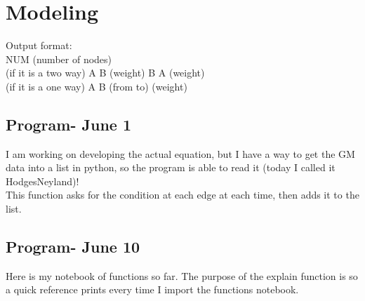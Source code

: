 \documentclass{article}
\begin{document}



\newpage
\section{Modeling}
Output format: \\
NUM (number of nodes) \\
(if it is a two way) A B (weight) B A (weight) \\
(if it is a one way) A B (from to) (weight) \\

\subsection{Program- June 1}
I am working on developing the actual equation, but I have a way to get the GM data into a list in python, so the program is able to read it (today I called it HodgesNeyland)! \\
This function asks for the condition at each edge at each time, then adds it to the list. 



\subsection{Program- June 10}
Here is my notebook of functions so far. The purpose of the explain function is so a quick reference prints every time I import the functions notebook.
\end{document}

